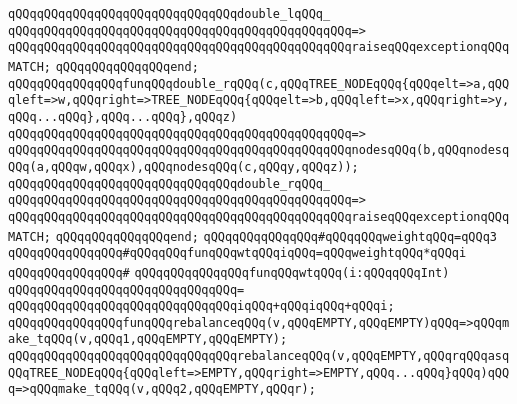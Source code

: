 \newline
\verb|qQQqqQQqqQQqqQQqqQQqqQQqqQQqqQQqdouble_lqQQq_|\newline
\verb|qQQqqQQqqQQqqQQqqQQqqQQqqQQqqQQqqQQqqQQqqQQqqQQq=>|\newline
\verb|qQQqqQQqqQQqqQQqqQQqqQQqqQQqqQQqqQQqqQQqqQQqqQQqraiseqQQqexceptionqQQqMATCH;|\newline
\verb|qQQqqQQqqQQqqQQqend;|\newline
\newline
\newline
\verb|qQQqqQQqqQQqqQQqfunqQQqdouble_rqQQq(c,qQQqTREE_NODEqQQq{qQQqelt=>a,qQQqleft=>w,qQQqright=>TREE_NODEqQQq{qQQqelt=>b,qQQqleft=>x,qQQqright=>y,qQQq...qQQq},qQQq...qQQq},qQQqz)|\newline
\verb|qQQqqQQqqQQqqQQqqQQqqQQqqQQqqQQqqQQqqQQqqQQqqQQq=>|\newline
\verb|qQQqqQQqqQQqqQQqqQQqqQQqqQQqqQQqqQQqqQQqqQQqqQQqnodesqQQq(b,qQQqnodesqQQq(a,qQQqw,qQQqx),qQQqnodesqQQq(c,qQQqy,qQQqz));|\newline
\newline
\verb|qQQqqQQqqQQqqQQqqQQqqQQqqQQqqQQqdouble_rqQQq_|\newline
\verb|qQQqqQQqqQQqqQQqqQQqqQQqqQQqqQQqqQQqqQQqqQQqqQQq=>|\newline
\verb|qQQqqQQqqQQqqQQqqQQqqQQqqQQqqQQqqQQqqQQqqQQqqQQqraiseqQQqexceptionqQQqMATCH;|\newline
\verb|qQQqqQQqqQQqqQQqend;|\newline
\newline
\newline
\verb|qQQqqQQqqQQqqQQq#qQQqqQQqweightqQQq=qQQq3|\newline
\verb|qQQqqQQqqQQqqQQq#qQQqqQQqfunqQQqwtqQQqiqQQq=qQQqweightqQQq*qQQqi|\newline
\verb|qQQqqQQqqQQqqQQq#|\newline
\verb|qQQqqQQqqQQqqQQqfunqQQqwtqQQq(i:qQQqqQQqInt)|\newline
\verb|qQQqqQQqqQQqqQQqqQQqqQQqqQQqqQQq=|\newline
\verb|qQQqqQQqqQQqqQQqqQQqqQQqqQQqqQQqiqQQq+qQQqiqQQq+qQQqi;|\newline
\newline
\verb|qQQqqQQqqQQqqQQqfunqQQqrebalanceqQQq(v,qQQqEMPTY,qQQqEMPTY)qQQq=>qQQqmake_tqQQq(v,qQQq1,qQQqEMPTY,qQQqEMPTY);|\newline
\verb|qQQqqQQqqQQqqQQqqQQqqQQqqQQqqQQqrebalanceqQQq(v,qQQqEMPTY,qQQqrqQQqasqQQqTREE_NODEqQQq{qQQqleft=>EMPTY,qQQqright=>EMPTY,qQQq...qQQq}qQQq)qQQq=>qQQqmake_tqQQq(v,qQQq2,qQQqEMPTY,qQQqr);|\newline
